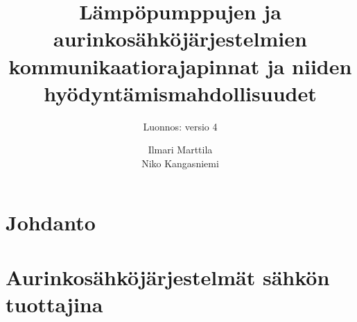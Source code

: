 \documentclass{tauthesis}
\begin{document}

\frontmatter


\title{Lämpöpumppujen ja aurinkosähköjärjestelmien kommunikaatiorajapinnat ja niiden hyödyntämismahdollisuudet}
\subtitle{Luonnos: versio 4}

\author{Ilmari Marttila \\ Niko Kangasniemi}






\keywords%
    {}

\maketitle




\tableofcontents

\listoffigures
\listoftables


\glossary

\mainmatter

\chapter{Johdanto}
\label{ch:johdanto}


\chapter{Aurinkosähköjärjestelmät sähkön tuottajina}
\label{ch:jarjestelmat_sahkon_tuottajina}

\end{document}
